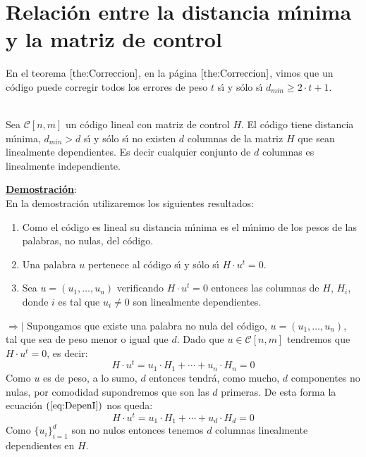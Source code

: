 %
%

\section{Relaci\'on entre la distancia m\'{\i}nima y la matriz de control}

En el teorema $\ref{the:Correccion}$, en la p\'agina $\pageref{the:Correccion}$,
vimos que un c\'odigo puede corregir todos los errores de peso $t$ s\'{\i} y
s\'olo s\'{\i} $d_{min}\geq 2\cdot t+1$.
%
\begin{teorema}\label{the:DistMin}
\ \\
Sea $\mathcal{C}[n,m]$ un c\'odigo lineal con matriz de control $H$. El c\'odigo
tiene distancia m\'{\i}nima, $d_{min}>d$ s\'{\i} y s\'olo s\'{\i} no existen
$d$ columnas de la matriz $H$ que sean linealmente dependientes. Es decir
cualquier conjunto de $d$ columnas es linealmente independiente.
\end{teorema}
\underline{\textbf{Demostraci\'on}}:\\
En la demostraci\'on utilizaremos los siguientes resultados:
\begin{enumerate}
\item Como el c\'odigo es lineal su distancia m\'{\i}nima es el m\'{\i}nimo de 
los pesos de las palabras, no nulas, del c\'odigo.
\item Una palabra $u$ pertenece al c\'odigo s\'{\i} y s\'olo s\'{\i}
$H\cdot u^t=0$.
\item Sea $u=(u_1,\dots,u_n)$ verificando $H\cdot u^t=0$ entonces las columnas
de $H$, $H_i$, donde $i$ es tal que $u_i\neq 0$ son linealmente dependientes.
\end{enumerate}
$\Rightarrow |$ Supongamos que existe una palabra no nula del c\'odigo,
$u=(u_1,\dots,u_n)$, tal que sea de peso menor o igual que $d$. Dado que 
$u\in \mathcal{C}[n,m]$ tendremos que $H\cdot u^t=0$, es decir:
\begin{equation}\label{eq:DepenI}
H\cdot u^t = u_1\cdot H_1+\cdots +u_n\cdot H_n = 0
\end{equation}
Como $u$ es de peso, a lo sumo, $d$ entonces tendr\'a, como mucho, $d$
componentes no nulas, por comodidad supondremos que son las $d$ primeras. De
esta forma la ecuaci\'on $(\ref{eq:DepenI})$ nos queda:
\begin{displaymath}
H\cdot u^t = u_1\cdot H_1+\cdots + u_d\cdot H_d = 0
\end{displaymath}
Como $\{u_i\}_{i=1}^d$ son no nulos entonces tenemos $d$ columnas linealmente
dependientes en $H$.\\

